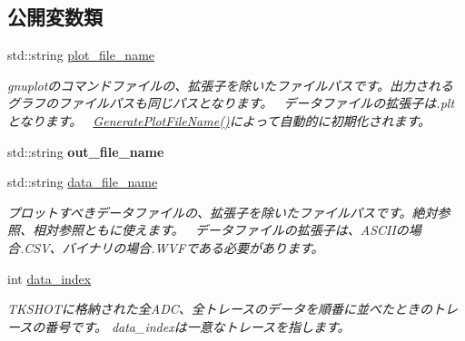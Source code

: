 \subsection*{公開変数類}
\begin{DoxyCompactItemize}
\item 
\mbox{\label{class_t_k_p_l_o_t_1_1_p_l_o_t_i_n_f_o_ac1dae6b6cd429f4276f5a4491af8c24d}} 
std\+::string \hyperlink{class_t_k_p_l_o_t_1_1_p_l_o_t_i_n_f_o_ac1dae6b6cd429f4276f5a4491af8c24d}{plot\+\_\+file\+\_\+name}
\begin{DoxyCompactList}\small\item\em gnuplotのコマンドファイルの、拡張子を除いたファイルパスです。出力されるグラフのファイルパスも同じパスとなります。~\newline
 データファイルの拡張子は.\+pltとなります。~\newline
 \hyperlink{class_t_k_p_l_o_t_1_1_p_l_o_t_i_n_f_o_aa5593f16a8756e42b0ba5e82f79ffd11}{Generate\+Plot\+File\+Name()}によって自動的に初期化されます。 \end{DoxyCompactList}\item 
\mbox{\label{class_t_k_p_l_o_t_1_1_p_l_o_t_i_n_f_o_ad8458a0719e051e6e3ee9166fffbf311}} 
std\+::string {\bfseries out\+\_\+file\+\_\+name}
\item 
std\+::string \hyperlink{class_t_k_p_l_o_t_1_1_p_l_o_t_i_n_f_o_a18a67313f8bb54564f35f6e6eddef899}{data\+\_\+file\+\_\+name}
\begin{DoxyCompactList}\small\item\em プロットすべきデータファイルの、拡張子を除いたファイルパスです。絶対参照、相対参照ともに使えます。~\newline
 データファイルの拡張子は、\+A\+S\+C\+I\+Iの場合.\+C\+S\+V、バイナリの場合.\+W\+V\+Fである必要があります。 \end{DoxyCompactList}\item 
\mbox{\label{class_t_k_p_l_o_t_1_1_p_l_o_t_i_n_f_o_a027ef6fcbaf4b3356926d853e2223e64}} 
int \hyperlink{class_t_k_p_l_o_t_1_1_p_l_o_t_i_n_f_o_a027ef6fcbaf4b3356926d853e2223e64}{data\+\_\+index}
\begin{DoxyCompactList}\small\item\em T\+K\+S\+H\+O\+Tに格納された全\+A\+D\+C、全トレースのデータを順番に並べたときのトレースの番号です。 data\+\_\+indexは一意なトレースを指します。 \end{DoxyCompactList}\item 

\end{DoxyCompactItemize}
